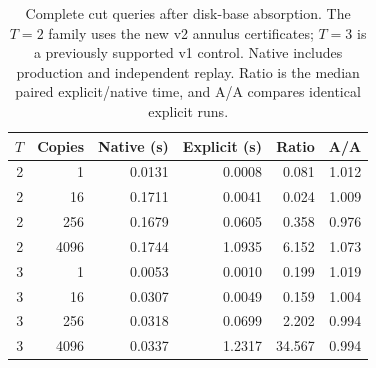 \begin{table}[htbp]
\centering
\begin{tabular}{rrrrrr}
\toprule
$T$ & Copies & Native (s) & Explicit (s) & Ratio & A/A \\
\midrule
2 & 1 & 0.0131 & 0.0008 & 0.081 & 1.012 \\
2 & 16 & 0.1711 & 0.0041 & 0.024 & 1.009 \\
2 & 256 & 0.1679 & 0.0605 & 0.358 & 0.976 \\
2 & 4096 & 0.1744 & 1.0935 & 6.152 & 1.073 \\
3 & 1 & 0.0053 & 0.0010 & 0.199 & 1.019 \\
3 & 16 & 0.0307 & 0.0049 & 0.159 & 1.004 \\
3 & 256 & 0.0318 & 0.0699 & 2.202 & 0.994 \\
3 & 4096 & 0.0337 & 1.2317 & 34.567 & 0.994 \\
\bottomrule
\end{tabular}
\caption{Complete cut queries after disk-base absorption. The $T=2$ family
uses the new v2 annulus certificates; $T=3$ is a previously supported v1
control. Native includes production and independent replay. Ratio is the
median paired explicit/native time, and A/A compares identical explicit runs.}
\label{marked-cut:absorption-timings}
\end{table}
